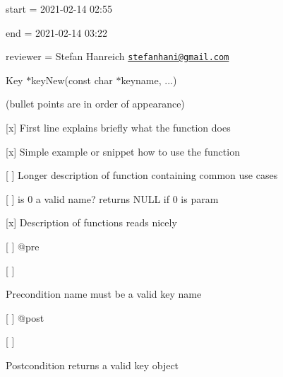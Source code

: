 
\begin{DoxyItemize}
\item start = 2021-\/02-\/14 02\+:55
\item end = 2021-\/02-\/14 03\+:22
\item reviewer = Stefan Hanreich \href{mailto:stefanhani@gmail.com}{\tt stefanhani@gmail.\+com}
\end{DoxyItemize}

{\ttfamily Key $\ast$key\+New(const char $\ast$keyname, ...)}

(bullet points are in order of appearance)


\begin{DoxyItemize}
\item \mbox{[}x\mbox{]} First line explains briefly what the function does
\item \mbox{[}x\mbox{]} Simple example or snippet how to use the function
\item \mbox{[} \mbox{]} Longer description of function containing common use cases
\begin{DoxyItemize}
\item \mbox{[} \mbox{]} is 0 a valid name? returns N\+U\+LL if 0 is param
\end{DoxyItemize}
\item \mbox{[}x\mbox{]} Description of functions reads nicely
\item \mbox{[} \mbox{]} {\ttfamily @pre}
\begin{DoxyItemize}
\item \mbox{[} \mbox{]} \begin{DoxyPrecond}{Precondition}
name must be a valid key name
\end{DoxyPrecond}

\end{DoxyItemize}
\item \mbox{[} \mbox{]} {\ttfamily @post}
\begin{DoxyItemize}
\item \mbox{[} \mbox{]} \begin{DoxyPostcond}{Postcondition}
returns a valid key object
\end{DoxyPostcond}


\end{DoxyItemize}
\end{DoxyItemize}
